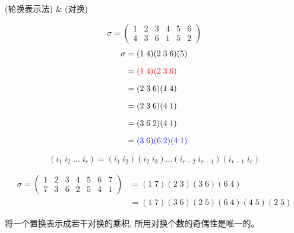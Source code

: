 
\begin{frame}{}
  \begin{center}
     (轮换表示法) \&  (对换)
  \end{center}
  \[
    \sigma = \begin{pmatrix}
      1 & 2 & 3 & 4 & 5 & 6 \\
      4 & 3 & 6 & 1 & 5 & 2
    \end{pmatrix}
  \]
  \vspace{-0.50cm}
  \begin{align*}
    \sigma &= (1\; 4) (2\; 3\; 6) (5) \\[6pt]
      &= \textcolor{red}{(1\; 4) (2\; 3\; 6)} \\[6pt]
      &= (2\; 3\; 6) (1\; 4) \\[6pt]
      &= (2\; 3\; 6) (4\; 1) \\[6pt]
      &= (3\; 6\; 2) (4\; 1) \\[6pt]
      &= \textcolor{blue}{(3\; 6) (6\; 2) (4\; 1)}
  \end{align*}

  \pause
  \vspace{-0.50cm}
  \[
    (i_{1}\; i_{2}\; \dots\; i_{r}) =
      (i_{1}\; i_{2})(i_{2}\; i_{3}) \dots (i_{r-2}\; i_{r-1}) (i_{r-1}\; i_{r})
  \]
  \begin{center}
  \end{center}
\end{frame}

\begin{frame}{}
  \begin{align*}
    \sigma = \begin{pmatrix}
      1 & 2 & 3 & 4 & 5 & 6 & 7 \\
      7 & 3 & 6 & 2 & 5 & 4 & 1
    \end{pmatrix} &=
    (1\;7) (2\;3) (3\;6) (6\;4) \\
    &= (1\;7) (3\;6) (2\;5) (6\;4) (4\;5) (2\;5)
  \end{align*}

  \pause
  \vspace{0.30cm}
  \begin{theorem}
    将一个置换表示成若干对换的乘积, 所用对换个数的奇偶性是唯一的。
  \end{theorem}
\end{frame}


